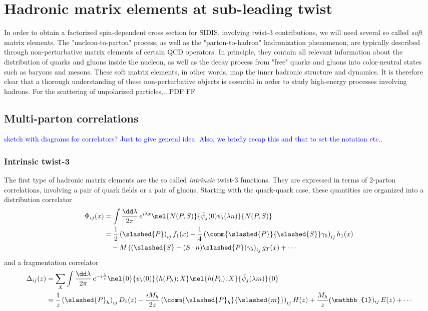 \chapter{Hadronic matrix elements at sub-leading twist}
In order to obtain a factorized spin-dependent cross section for SIDIS, involving twist-3 contributions, we will need several so called \textit{soft} matrix elements. The "nucleon-to-parton" process, as well as the "parton-to-hadron" hadronization phenomenon, are typically described through non-perturbative matrix elements of certain QCD operators. In principle, they contain all relevant information about the distribution of quarks and gluons inside the nucleon, as well as the decay process from "free" quarks and gluons into color-neutral states such as baryons and mesons. These soft matrix elements, in other words, map the inner hadronic structure and dynamics. It is therefore clear that a thorough understanding of these non-perturbative objects is essential in order to study high-energy processes involving hadrons. For the scattering of unpolarized particles,...PDF FF \cite{rein2025}
\section{Multi-parton correlations}
\textcolor{blue}{sketch with diagrams for correlators? Just to give general idea. Also, we briefly recap this and that to set the notation etc..}
\subsection{Intrinsic twist-3}
The first type of hadronic matrix elements are the so called \textit{intrinsic} twist-3 functions. They are expressed in terms of 2-parton correlations, involving a pair of quark fields or a pair of gluons. Starting with the quark-quark case, these quantities are organized into a distribution correlator
\begin{equation}
    \begin{aligned}
        \Phi_{ij}(x)&= \int\frac{\dd \lambda}{2\pi} \,e^{i\lambda x}\mel{N(P,S)}{\bar \psi_j(0) \psi_i(\lambda n)}{N(P,S)}\\
        &= \frac{1}{2}\left(\slashed{P}\right)_{ij} f_1(x)
        -\frac{1}{4} \left(\comm{\slashed{P}}{\slashed{S}}\gamma_5\right)_{ij} h_1(x)\\
        &\quad-M\left((\slashed{S}-(S \cdot n) \slashed{P}) \gamma_5\right)_{ij} g_T(x)+\cdots
    \end{aligned}
\end{equation}
and a fragmentation correlator
\begin{equation}
    \begin{aligned}
        \Delta_{ij}(z)&= \sum_X\int\frac{\dd \lambda}{2\pi} \,e^{-i\frac{\lambda}{z}}\mel{0}{\psi_i(0)}{h(P_h);X}\mel{h(P_h);X}{\bar \psi_j(\lambda m)}{0}\\
        &= \frac{1}{z}\left(\slashed{P}_h\right)_{ij} D_1(z)-\frac{iM_h}{2z} \left(\comm{\slashed{P}_h}{\slashed{m}}\right)_{ij} H(z)+\frac{M_h}{z}(\mathbb{1})_{ij}\,E(z)+\cdots
        \end{aligned}
\end{equation}


